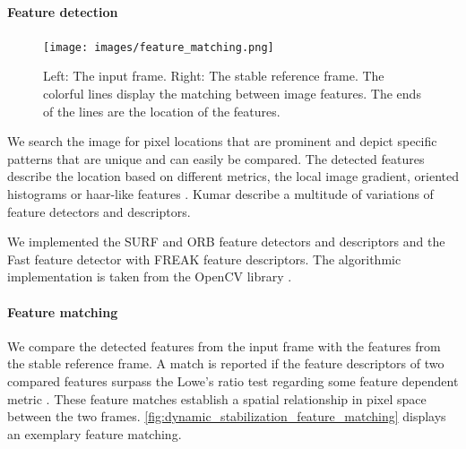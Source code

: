 \paragraph{Feature detection}
\begin{figure}[t]
   \begin{center}
      \texttt{[image: images/feature\_matching.png]}
   \end{center}
   \caption{
      Left: The input frame. 
      Right: The stable reference frame.
      The colorful lines display the matching between image features. 
      The ends of the lines are the location of the features.
       }
   \label{fig:dynamic_stabilization_feature_matching}
\end{figure}

We search the image for pixel locations that are prominent and depict specific patterns that are unique and can easily be compared.
The detected features describe the location based on different metrics, \eg{} the local image gradient, oriented histograms or haar-like features \cite{stork2001pattern}.
Kumar \etal{} \cite{kumar2014survey} describe a multitude of variations of feature detectors and descriptors.

We implemented the SURF \cite{bay10.1007/11744023_32} and ORB \cite{rublee6126544} feature detectors and descriptors and the Fast \cite{Ghahremani_2021} feature detector with FREAK \cite{alahi6247715} feature descriptors. The algorithmic implementation is taken from the OpenCV library \cite{opencv_library}. 


\paragraph{Feature matching}
We compare the detected features from the input frame with the features from the stable reference frame.
A match is reported if the feature descriptors of two compared features surpass the Lowe's ratio test \cite{lowe10.1023/B:VISI.0000029664.99615.94} regarding some feature dependent metric \cite{kumar2014survey}.
These feature matches establish a spatial relationship in pixel space between the two frames.
\autoref{fig:dynamic_stabilization_feature_matching} displays an exemplary feature matching.

